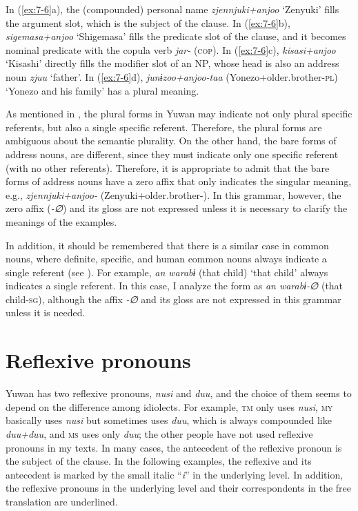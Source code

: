   \z
\z

In (\ref{ex:7-6}a), the (compounded) personal name \textit{zjennjuki+anjoo} ‘Zenyuki’ fills the argument slot, which is the subject of the clause. In (\ref{ex:7-6}b), \textit{sigemasa+anjoo} ‘Shigemasa’ fills the predicate slot of the clause, and it becomes nominal predicate with the copula verb \textit{jar-} (\textsc{cop}). In (\ref{ex:7-6}c), \textit{kisasi+anjoo} ‘Kisashi’ directly fills the modifier slot of an NP, whose head is also an address noun \textit{zjuu} ‘father’. In (\ref{ex:7-6}d), \textit{junɨzoo+anjoo-taa} (Yonezo+older.brother-\textsc{pl}) ‘Yonezo and his family’ has a plural meaning.

  As mentioned in , the plural forms in Yuwan may indicate not only plural specific referents, but also a single specific referent. Therefore, the plural forms are ambiguous about the semantic plurality. On the other hand, the bare forms of address nouns, are different, since they must indicate only one specific referent (with no other referents). Therefore, it is appropriate to admit that the bare forms of address nouns have a zero affix that only indicates the singular meaning, e.g., \textit{zjennjuki+anjoo-} (Zenyuki+older.brother-\textsc{}). In this grammar, however, the zero affix (\textit{-∅}) and its gloss are not expressed  unless it is necessary to clarify the meanings of the examples.
  
  
  In addition, it should be remembered that there is a similar case in common nouns, where definite, specific, and human common nouns always indicate a single referent (see ). For example, \textit{an warabɨ} (that child) ‘that child’ always indicates a single referent. In this case, I analyze the form as \textit{an warabɨ-∅} (that child-\textsc{sg}), although the affix \textit{-∅} and its gloss are not expressed in this grammar unless it is needed.


\section{Reflexive pronouns}

Yuwan has two reflexive pronouns, \textit{nusi} and \textit{duu}, and the choice of them seems to depend on the difference among idiolects. For example, \textsc{tm} only uses \textit{nusi}, \textsc{my} basically uses \textit{nusi} but sometimes uses \textit{duu}, which is always compounded like \textit{duu+duu}, and \textsc{ms} uses only \textit{duu}; the other people have not used reflexive pronouns in my texts. In many cases, the antecedent of the reflexive pronoun is the subject of the clause. In the following examples, the reflexive and its antecedent is marked by the small italic “\textit{i}” in the underlying level. In addition, the reflexive pronouns in the underlying level and their correspondents in the free translation are underlined.

